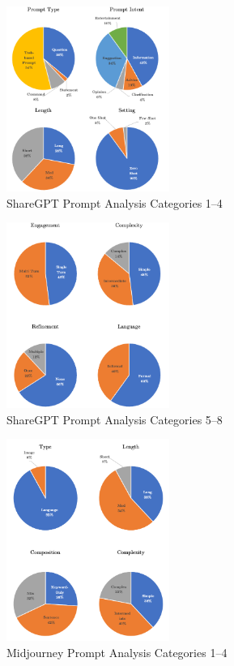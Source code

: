 \begin{figure}[t]
    \centering
    \includegraphics[width=0.475\textwidth]{images/charts1}
    \caption{ShareGPT Prompt Analysis Categories 1--4}
    \label{fig:chatgpt-categories-1}
\end{figure}
\begin{figure}[t]
    \centering
    \includegraphics[width=0.475\textwidth]{images/charts2}
    \caption{ShareGPT Prompt Analysis Categories 5--8}
    \label{fig:chatgpt-categories-2}
\end{figure}
\begin{figure}[t]
    \centering
    \includegraphics[width=0.475\textwidth]{images/charts3}
    \caption{Midjourney Prompt Analysis Categories 1--4}
    \label{fig:midjourney-categories-1}
\end{figure}
